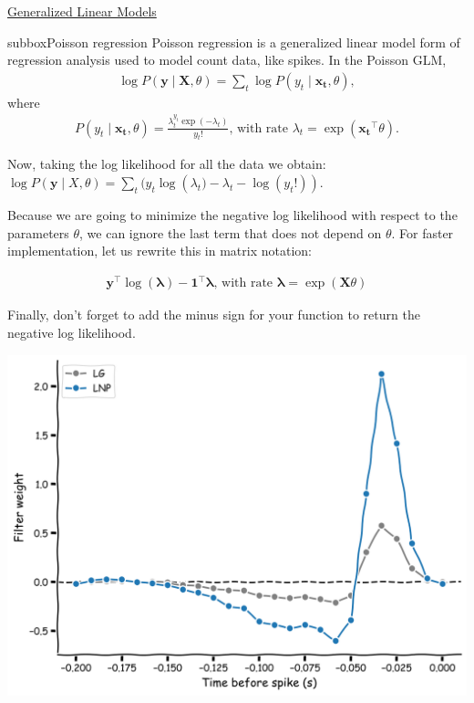 \begin{textbox}{\href{https://compneuro.neuromatch.io/tutorials/W1D3_GeneralizedLinearModels/student/W1D3_Tutorial1.html}{Generalized Linear Models } }
\begin{subbox}{subbox}{Poisson regression}
\scriptsize
Poisson regression is a generalized linear model form of regression analysis used to model count data, like spikes.
In the Poisson GLM,
\begin{align}
\log P(\mathbf{y} \mid \mathbf{X}, \theta) = \sum_t \log P(y_t \mid \mathbf{x_t},\theta),
\end{align}
where
\begin{align}
P(y_t \mid \mathbf{x_t}, \theta) = \frac{\lambda_t^{y_t}\exp(-\lambda_t)}{y_t!} \text{, with rate } \lambda_t = \exp(\mathbf{x_t}^{\top} \theta).
\end{align}

Now, taking the log likelihood for all the data we obtain:
$\log P(\mathbf{y} \mid X, \theta) = \sum_t( y_t \log\left(\lambda_t) - \lambda_t - \log(y_t !)\right).$

Because we are going to minimize the negative log likelihood with respect to the parameters $\theta$, we can ignore the last term that does not depend on $\theta$. For faster implementation, let us rewrite this in matrix notation:

\begin{align}
\mathbf{y}^{\top} \log(\mathbf{\lambda}) - \mathbf{1}^{\top} \mathbf{\lambda} \text{, with  rate } \mathbf{\lambda} = \exp(\mathbf{X} \theta)
\end{align}

Finally, don't forget to add the minus sign for your function to return the negative log likelihood.

\centering
\includegraphics[scale=0.1]{Figures/GLM/GLMFigure3.png}
\end{subbox}


\end{textbox}
